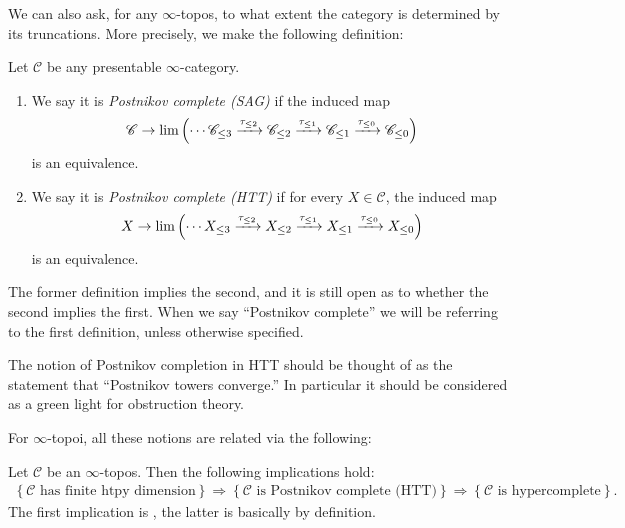 \documentclass[11pt,openany]{book}
\begin{document}
We can also ask, for any $\infty$-topos, to what extent the category is determined by its truncations. More precisely, we make the following definition:

\begin{definition}
Let $\mathscr{C}$ be any presentable $\infty$-category.

\begin{enumerate}
    \item We say it is \textit{Postnikov complete (SAG)} if the induced map
\begin{align*}
    \mathscr{C} \to \lim \left( \cdots \mathscr{C}_{\le 3} \xrightarrow{\tau_{\le 2}} \mathscr{C}_{\le 2} \xrightarrow{\tau_{\le 1}} \mathscr{C}_{\le 1}\xrightarrow{\tau_{\le 0}} \mathscr{C}_{\le 0} \right)
\end{align*}
is an equivalence.
    \item We say it is \textit{Postnikov complete (HTT)} if for every $X\in \mathscr{C}$, the induced map
    \begin{align*}
        X \to \lim \left( \cdots X_{\le 3} \xrightarrow{\tau_{\le 2}} X_{\le 2} \xrightarrow{\tau_{\le 1}} X_{\le 1}\xrightarrow{\tau_{\le 0}} X_{\le 0} \right)
    \end{align*}
    is an equivalence.
\end{enumerate}
The former definition implies the second, and it is still open as to whether the second implies the first. When we say ``Postnikov complete'' we will be referring to the first definition, unless otherwise specified.
\end{definition}

\begin{slogan} The notion of Postnikov completion in HTT should be thought of as the statement that ``Postnikov towers converge.'' In particular it should be considered as a green light for obstruction theory.
\end{slogan}

For $\infty$-topoi, all these notions are related via the following:

\begin{proposition}\label{prop:htpy-dim-Postnikov-complete-hypercomplete} 
Let $\mathscr{C}$ be an $\infty$-topos. Then the following implications hold:
\begin{align*}
    \left\{ \mathscr{C}\text{ has finite htpy dimension} \right\}\Rightarrow \left\{ \mathscr{C}\text{ is Postnikov complete (HTT)} \right\}\Rightarrow \left\{ \mathscr{C}\text{ is hypercomplete} \right\}.
\end{align*}
The first implication is \cite[7.2.1.10]{HTT}, the latter is basically by definition. %
\end{proposition}
\end{document}
